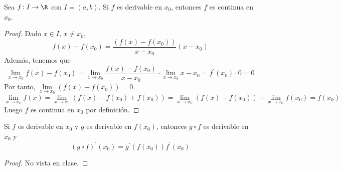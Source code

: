 \begin{theorem}
	Sea \(f \colon I \to \R \) con \(I = (a,b)\).
	Si \(f \) es derivable en \(x_0\), entonces \(f \) es continua en \(x_0 \).
\end{theorem}
\begin{proof}
	Dado \(x \in I \), \(x \neq x_0\), 
	\[
		f(x) - f(x_0) = \frac{(f(x) - f(x_0))}{x - x_0} (x - x_0)
	\]
	Además, tenemos que
	\[
		\lim\limits_{x  \to x_0 } f(x) - f(x_0) = \lim\limits_{x  \to x_0 } \frac{f(x) - f(x_0)}{x - x_0} \cdot \lim\limits_{x  \to x_0 } x - x_0 = f^\prime (x_0) \cdot 0 = 0
	\]
	Por tanto, \(\lim\limits_{x  \to x_0 } (f(x) - f(x_0)) = 0 \).
	\[
		\lim\limits_{x  \to x_0 } f(x) = \lim\limits_{x  \to x_0 } (f(x) - f(x_0) + f(x_0)) = \lim\limits_{x  \to x_0 } (f(x) - f(x_0)) + \lim\limits_{x  \to x_0 } f(x_0) = f(x_0)
	\]
	Luego \(f \) es continua en \(x_0 \) por definición. 
\end{proof}
\begin{theorem}
	Si \(f \) es derivable en \(x_0 \) y \(g \) es derivable en \(f(x_0 )\), entonces \(g \circ f \) es derivable en \(x_0 \) y
	\[
		(g \circ f)^\prime (x_0) = g^\prime (f(x_0)) f^\prime (x_0)
	\]
\end{theorem}
\begin{proof}
	No vista en clase. 
\end{proof}
